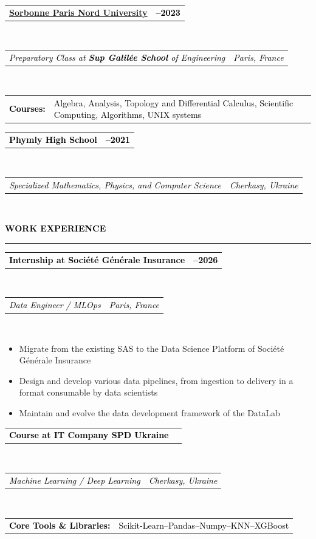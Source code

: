 \documentclass[10pt,english,french]{article}
\makeatletter
\newcommand{\workIcon}[1][black]{\textcolor{#1}{\faBriefcase}}
\newlength{\mpwidth}
\newcommand{\cvsection}[1]{
    \vspace{5pt}
    \textbf{\fontsize{12pt}{10pt}\selectfont \textcolor{black}{#1}}
    \vspace{8pt}
    \hrule
    \vspace{8pt}
}
\newcommand{\cvevent}[2]{
    \vspace{2pt}
    \parbox{\mpwidth}{
        \begin{tabular*}{1\mpwidth}{@{\extracolsep{\fill}} l r}
            \textcolor{black}{\textbf{\fontsize{11}{12}\selectfont #1}} & \textcolor{black}{\textbf{\fontsize{12}{12}\selectfont #2}} \\
        \end{tabular*}\\[-8pt] %
    }
}
\newcommand{\cvsubevent}[2]{
    \parbox{\mpwidth}{
        \begin{tabular*}{1\mpwidth}{@{\extracolsep{\fill}} l r}
            \textcolor{black}{\textit{\fontsize{10}{12}\selectfont #1}} & \textcolor{black}{\textit{\fontsize{10}{12}\selectfont #2}} \\
        \end{tabular*}\\[-8pt] %
    }
    \vspace{-10pt}
}
\newcommand{\cvcourses}[2]{
    \begin{tabularx}{\mpwidth}{@{}lX@{}}
        \textcolor{black}{\textbf{\fontsize{10}{12}\selectfont #1}} & \textcolor{black}{\fontsize{10}{12}\selectfont #2}
    \end{tabularx}
    \vspace{12pt}
}
\makeatother
\begin{document}
\vspace{-6pt}
\cvevent{\href{https://www.sup-galilee.univ-paris13.fr/index.php/formation/cp2i/}{Sorbonne Paris Nord University}}{2021\hspace{5pt}--\hspace{5pt}2023}
\cvsubevent{Preparatory Class at \textbf{Sup Galilée School} of Engineering}{Paris, France}
\cvcourses{Courses:}{Algebra, Analysis, Topology and Differential Calculus, Scientific Computing, Algorithms, UNIX systems}

\vspace{-12pt}
\cvevent{Phymly High School}{2016\hspace{5pt}--\hspace{5pt}2021}
\cvsubevent{Specialized Mathematics, Physics, and Computer Science}{Cherkasy, Ukraine}

\vspace{-2pt}
\cvsection{\workIcon[black]\hspace{4pt}WORK EXPERIENCE}

\vspace{-4pt}
\cvevent{Internship at Société Générale Insurance}{2023\hspace{5pt}--\hspace{5pt}2026}
\cvsubevent{Data Engineer / MLOps}{Paris, France}
\vspace{-3pt}
\begin{itemize}[leftmargin=0.5cm, label=\textbullet, itemsep=0.0625em]
    \item Migrate from the existing SAS to the Data Science Platform of Société Générale
          Insurance
    \item Design and develop various data pipelines, from ingestion to delivery in a
          format consumable by data scientists
    \item Maintain and evolve the data development framework of the DataLab
\end{itemize}

\vspace{-2pt}
\cvevent{Course at IT Company SPD Ukraine}{2021}
\cvsubevent{Machine Learning / Deep Learning}{Cherkasy, Ukraine}
\cvcourses{Core Tools \& Libraries:}{Scikit-Learn\hspace{5pt}--\hspace{5pt}Pandas\hspace{5pt}--\hspace{5pt}Numpy\hspace{5pt}--\hspace{5pt}KNN\hspace{5pt}--\hspace{5pt}XGBoost}
\end{document}
